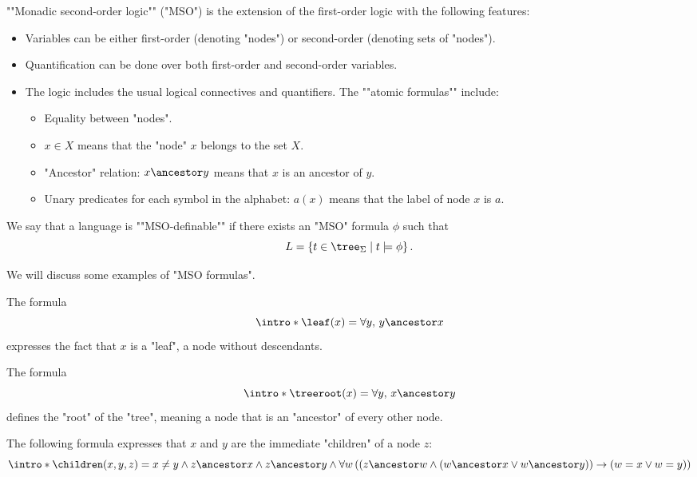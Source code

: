 \documentclass[a4paper,UKenglish,cleveref, autoref, thm-restate]{lipics-v2021}
\begin{document}
\begin{definition}
	\AP ""Monadic second-order logic"" (\reintro*"MSO") is the extension of the first-order logic with the following features:
	\begin{itemize}
		\item Variables can be either first-order (denoting "nodes") or second-order (denoting sets of "nodes").
		\item Quantification can be done over both first-order and second-order variables.
		\item The logic includes the usual logical connectives and quantifiers.
		      \itemAP The ""atomic formulas"" include:
		      \begin{itemize}
			      \item Equality between "nodes".
			      \item $x \in X$ means that the "node" $x$ belongs to the set $X$.
			      \item "Ancestor" relation: \( x \ancestor y \) means that \( x \) is an ancestor of \( y \).
			      \item Unary predicates for each symbol in the alphabet: \( a(x) \) means that the label of node \( x \) is \( a \).
		      \end{itemize}
	\end{itemize}
\end{definition}

\begin{definition}
	\AP We say that a language is ""MSO-definable"" if there exists an "MSO" formula \( \phi \) such that
	\[
		L = \setdef{t \in \tree_{\Sigma}}{t \models \phi}.
	\]
\end{definition}


We will discuss some examples of "MSO formulas".

\begin{example}
	\AP The formula
	\[
		\intro* \leaf(x) = \forall y,\, y \ancestor x
	\]
	expresses the fact that $x$ is a "leaf", a node without descendants.
\end{example}

\begin{example}
	\AP The formula
	\[
		\intro* \treeroot(x) = \forall y,\, x \ancestor y
	\]
	defines the "root" of the "tree", meaning a node that is an "ancestor" of every other node.
\end{example}

\begin{example}
	\AP The following formula expresses that $x$ and $y$ are the immediate "children" of a node $z$:
	\[
		\intro* \children(x,y,z) =
		x \neq y \land
		z \ancestor x \land  z \ancestor y \land
		\forall w
		\left( \left(
			z \ancestor w \land
				(w \ancestor x \lor w \ancestor  y) \right) \rightarrow (
			w = x \lor w = y
			)
		\right)
	\]
\end{example}
\end{document}

